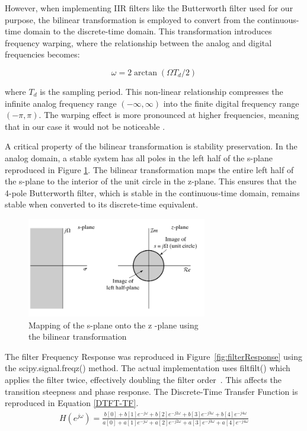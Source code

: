 However, when implementing IIR filters like the Butterworth filter used for our purpose, the bilinear transformation is employed to convert from the continuous-time domain to the discrete-time domain. This transformation introduces frequency warping, where the relationship between the analog and digital frequencies becomes:

$$\omega = 2 \arctan(\Omega T_d/2)$$

where $T_d$ is the sampling period. This non-linear relationship compresses the infinite analog frequency range $(-\infty, \infty)$ into the finite digital frequency range $(-\pi, \pi)$. The warping effect is more pronounced at higher frequencies, meaning that in our case it would not be noticeable \cite[p.529-530]{RefWorks:oppenheim2013discrete-time}.

A critical property of the bilinear transformation is stability preservation. In the analog domain, a stable system has all poles in the left half of the s-plane reproduced in Figure \ref{fig:unitCircle}. The bilinear transformation maps the entire left half of the s-plane to the interior of the unit circle in the z-plane. This ensures that the 4-pole Butterworth filter, which is stable in the continuous-time domain, remains stable when converted to its discrete-time equivalent. 
\begin{figure}[htbp] 
  \centering
  \includegraphics[width=0.7\textwidth]{chapters/methodology/ArduinoDAQ/oppenheimMappingCircle.png}
  \caption{Mapping of the s-plane onto the z -plane using \\ the bilinear transformation~\cite[p.130]{RefWorks:oppenheim2013discrete-time}}
  \label{fig:unitCircle}
\end{figure}

The filter Frequency Response was reproduced in Figure~\ref{fig:filterResponse} using the scipy.signal\-.freqz() method. The actual implementation uses filtfilt() which applies the filter twice, effectively doubling the filter order~\cite{RefWorks:2025filtfilt}. This affects the transition steepness and phase response. The Discrete-Time Transfer Function is reproduced in Equation \ref{DTFT-TF}.
\begin{equation} \label{DTFT-TF}
  \begin{split}
    H(e^{j\omega}) = \frac{b[0] + b[1]e^{-j\omega} + b[2]e^{-j2\omega} + b[3]e^{-j3\omega} + b[4]e^{-j4\omega}}{a[0] + a[1]e^{-j\omega} + a[2]e^{-j2\omega} + a[3]e^{-j3\omega} + a[4]e^{-j4\omega}}
  \end{split}
\end{equation}


